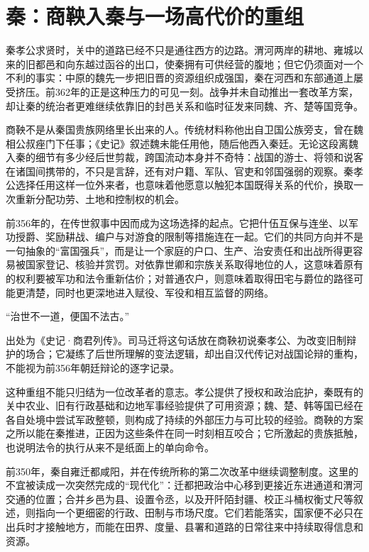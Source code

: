 \section{秦：商鞅入秦与一场高代价的重组}

秦孝公求贤时，关中的道路已经不只是通往西方的边路。渭河两岸的耕地、雍城以来的旧都邑和向东越过函谷的出口，使秦拥有可供经营的腹地；但它仍须面对一个不利的事实：中原的魏先一步把旧晋的资源组织成强国，秦在河西和东部通道上屡受挤压。前362年的正是这种压力的可见一刻。战争并未自动推出一套改革方案，却让秦的统治者更难继续依靠旧的封邑关系和临时征发来同魏、齐、楚等国竞争。

商鞅不是从秦国贵族网络里长出来的人。传统材料称他出自卫国公族旁支，曾在魏相公叔痤门下任事；《史记》叙述魏未能任用他，随后他西入秦廷。无论这段离魏入秦的细节有多少经后世剪裁，跨国流动本身并不奇特：战国的游士、将领和说客在诸国间携带的，不只是言辞，还有对户籍、军队、官吏和邻国强弱的观察。秦孝公选择任用这样一位外来者，也意味着他愿意以触犯本国既得关系的代价，换取一次重新分配功劳、土地和控制权的机会。

前356年的，在传世叙事中因而成为这场选择的起点。它把什伍互保与连坐、以军功授爵、奖励耕战、编户与对游食的限制等措施连在一起。它们的共同方向并不是一句抽象的“富国强兵”，而是让一个家庭的户口、生产、治安责任和出战所得更容易被国家登记、核验并赏罚。对依靠世卿和宗族关系取得地位的人，这意味着原有的权利要被军功和法令重新估价；对普通农户，则意味着取得田宅与爵位的路径可能更清楚，同时也更深地进入赋役、军役和相互监督的网络。

\begin{textwindow}[变法者的辩辞]
“治世不一道，便国不法古。”

出处为《史记·商君列传》。司马迁将这句话放在商鞅初说秦孝公、为改变旧制辩护的场合；它凝练了后世所理解的变法逻辑，却出自汉代传记对战国论辩的重构，不能视为前356年朝廷辩论的逐字记录。
\end{textwindow}

这种重组不能只归结为一位改革者的意志。孝公提供了授权和政治庇护，秦既有的关中农业、旧有行政基础和边地军事经验提供了可用资源；魏、楚、韩等国已经在各自处境中尝试军政整顿，则构成了持续的外部压力与可比较的经验。商鞅的方案之所以能在秦推进，正因为这些条件在同一时刻相互咬合；它所激起的贵族抵触，也说明法令的执行从来不是纸面上的单向命令。

前350年，秦自雍迁都咸阳，并在传统所称的第二次改革中继续调整制度。这里的不宜被读成一次突然完成的“现代化”：迁都把政治中心移到更接近东进通道和渭河交通的位置；合并乡邑为县、设置令丞，以及开阡陌封疆、校正斗桶权衡丈尺等叙述，则指向一个更细密的行政、田制与市场尺度。它们若能落实，国家便不必只在出兵时才接触地方，而能在田界、度量、县署和道路的日常往来中持续取得信息和资源。

